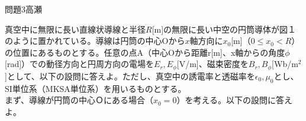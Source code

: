 \documentclass[fleqn]{jbook}
\begin{document}
\def\therefore{.\raise1ex\hbox{.}.}
\renewcommand{\figurename}{fig.}


\begin{question}{問題3}{高瀬}

真空中に無限に長い直線状導線と半径$R$[m]の無限に長い中空の円筒導体が図１のように置かれている。導線は円筒の中心Oから$x$軸方向に$x_0$[m]（$0 \le x_0 < R$）の位置にあるものとする。任意の点A（中心Oから距離r[m]、x軸からの角度$\phi$[rad]）での動径方向と円周方向の電場を$E_r,E_\phi$[V/m]、磁束密度を$B_r,B_\phi$[Wb/m$^2$]として、以下の設問に答えよ。ただし、真空中の誘電率と透磁率を$\epsilon_0,\mu_0$とし、SI単位系（MKSA単位系）を用いるものとする。
\\

まず、導線が円筒の中心Ｏにある場合（$x_0=0$）を考える。以下の設問に答えよ。
\\


\end{question}
\end{document}
